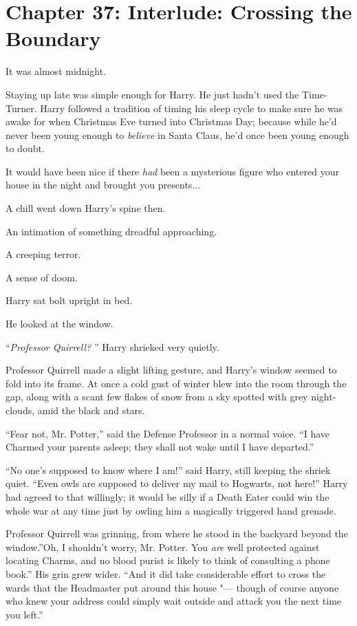 \chapter{Chapter 37: Interlude: Crossing the Boundary}
It was almost midnight.

Staying up late was simple enough for Harry. He just hadn't used the
Time-Turner. Harry followed a tradition of timing his sleep cycle to
make sure he was awake for when Christmas Eve turned into Christmas Day;
because while he'd never been young enough to \emph{believe} in Santa
Claus, he'd once been young enough to doubt.

It would have been nice if there \emph{had} been a mysterious figure who
entered your house in the night and brought you presents...

A chill went down Harry's spine then.

An intimation of something dreadful approaching.

A creeping terror.

A sense of doom.

Harry sat bolt upright in bed.

He looked at the window.

``\emph{Professor Quirrell?} '' Harry shrieked very quietly.

Professor Quirrell made a slight lifting gesture, and Harry's window
seemed to fold into its frame. At once a cold gust of winter blew into
the room through the gap, along with a scant few flakes of snow from a
sky spotted with grey night-clouds, amid the black and stars.

``Fear not, Mr. Potter,'' said the Defense Professor in a normal voice.
``I have Charmed your parents asleep; they shall not wake until I have
departed.''

``No one's supposed to know where I am!'' said Harry, still keeping the
shriek quiet. ``Even owls are supposed to deliver my mail to Hogwarts,
not here!'' Harry had agreed to that willingly; it would be silly if a
Death Eater could win the whole war at any time just by owling him a
magically triggered hand grenade.

Professor Quirrell was grinning, from where he stood in the backyard
beyond the window.''Oh, I shouldn't worry, Mr. Potter. You \emph{are}
well protected against locating Charms, and no blood purist is likely to
think of consulting a phone book.'' His grin grew wider. ``And it did
take considerable effort to cross the wards that the Headmaster put
around this house "--- though of course anyone who knew your address could
simply wait outside and attack you the next time you left.''

